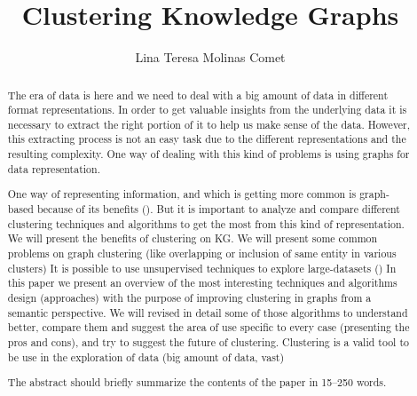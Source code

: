 \documentclass[runningheads]{llncs}
\begin{document}
%
\title{Clustering Knowledge Graphs}
%
%
\author{Lina Teresa Molinas Comet}
%
%
%
\maketitle              %
%
\begin{abstract}
The era of data is here and we need to deal with a big amount of data in different format representations. In order to get valuable insights from the underlying data it is necessary to extract the right portion of it to help us make sense of the data. However, this extracting process is not an easy task due to the different representations and the resulting complexity. One way of dealing with this kind of problems is using graphs for data representation.

One way of representing information, and which is getting more common is graph-based because of its benefits (). But it is important to analyze and compare different clustering techniques and algorithms to get the most from this kind of representation. We will present the benefits of clustering on KG. We will present some common problems on graph clustering (like overlapping or inclusion of same entity in various clusters)
It is possible to use unsupervised techniques to explore large-datasets ()
In this paper we present an overview of the most interesting techniques and algorithms design (approaches) with the purpose of improving clustering in graphs from a semantic perspective. We will revised in detail some of those algorithms to understand better, compare them and suggest the area of use specific to every case (presenting the pros and cons), and try to suggest the future of clustering.
Clustering is a valid tool to be use in the exploration of data (big amount of data, vast)

The abstract should briefly summarize the contents of the paper in
15--250 words.

\end{abstract}
%
%
%
\end{document}
